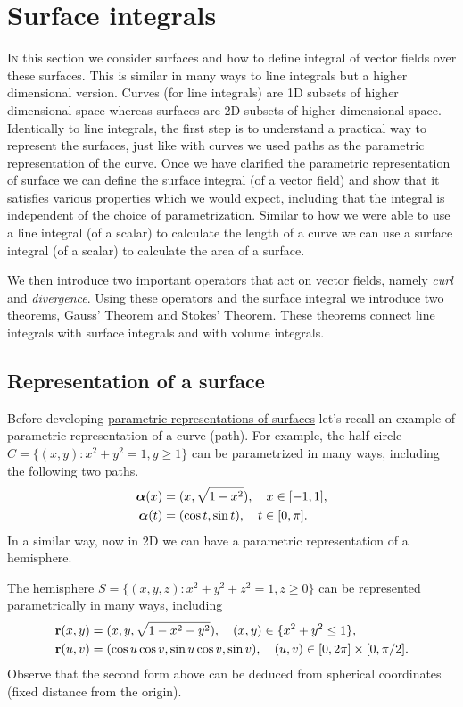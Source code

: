 \chapter{Surface integrals}
\bookletstart

\lettrine{I}{n} this section we consider surfaces and how to define integral of vector fields over these surfaces.
This is similar in many ways to line integrals but a higher dimensional version.
Curves (for line integrals) are 1D subsets of higher dimensional space whereas surfaces are 2D subsets of higher dimensional space.
Identically to line integrals, the first step is to understand a practical way to represent the surfaces, just like with curves we used paths as the parametric representation of the curve.
Once we have clarified the parametric representation of surface we can define the surface integral (of a vector field) and show that it satisfies various properties which we would expect, including that the integral is independent of the choice of parametrization.
Similar to how we were able to use a line integral (of a scalar) to calculate the length of a curve we can use a surface integral (of a scalar) to calculate the area of a surface.

We then introduce two important operators that act on vector fields, namely \emph{curl} and \emph{divergence}.
Using these operators and the surface integral we introduce two theorems, Gauss' Theorem and Stokes' Theorem.
These theorems connect line integrals with surface integrals and with volume integrals.

\section{Representation of a surface}

Before developing \href{https://en.wikipedia.org/wiki/Parametric_surface}{parametric representations of surfaces} let's recall an example of parametric representation of a curve (path).
For example, the half circle \(C=\{(x,y): x^2 + y^2=1, y\geq 1\}\) can be parametrized in many ways, including the following two paths.
\[
    \begin{aligned}
        \boldsymbol{\alpha}(x) & = (x,\sqrt{1-x^2}), \quad x\in [-1,1],  \\
        \boldsymbol{\alpha}(t) & = (\cos t, \sin t), \quad t\in [0,\pi].
    \end{aligned}
\]
In a similar way, now in 2D we can have a parametric representation of a hemisphere.
\begin{example*}[hemisphere]
    The hemisphere \(S = \{(x,y,z): x^2+y^2+z^2=1, z\geq 0\}\) can be represented parametrically in many ways, including
    \[
        \begin{aligned}
            \mathbf{r}(x,y) & =(x,y,{\sqrt{1-x^2 -y^2}}), \quad (x,y)\in\{x^2+y^2 \leq 1\},                             \\
            \mathbf{r}(u,v) & =({\cos u \cos v}, {\sin u \cos v}, {\sin v}), \quad (u,v)\in  [0,2\pi] \times [0,\pi/2].
        \end{aligned}
    \]
    Observe that the second form above can be deduced from spherical coordinates (fixed distance from the origin).
\end{example*}

